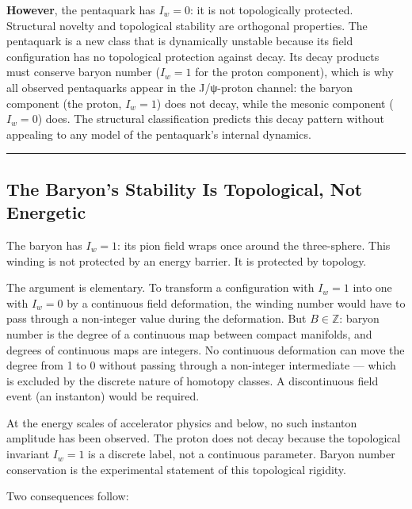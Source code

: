\documentclass[12pt,a4paper]{article}
\begin{document}
\textbf{However}, the pentaquark has \(I_w = 0\): it is not
topologically protected. Structural novelty and topological stability
are orthogonal properties. The pentaquark is a new class that
is dynamically unstable because its field configuration has no
topological protection against decay. Its decay products must conserve
baryon number (\(I_w = 1\) for the proton component), which is why all
observed pentaquarks appear in the J/ψ-proton channel: the baryon
component (the proton, \(I_w = 1\)) does not decay, while the mesonic
component (\(I_w = 0\)) does. The structural classification predicts
this decay pattern without appealing to any model of the pentaquark's
internal dynamics.

\begin{center}\rule{0.5\linewidth}{0.5pt}\end{center}

\hypertarget{the-baryons-stability-is-topological-not-energetic}{%
\subsection{The Baryon's Stability Is Topological, Not
Energetic}\label{the-baryons-stability-is-topological-not-energetic}}

The baryon has \(I_w = 1\): its pion field wraps once around the
three-sphere. This winding is not protected by an energy barrier. It is
protected by topology.

The argument is elementary. To transform a configuration with
\(I_w = 1\) into one with \(I_w = 0\) by a continuous field deformation,
the winding number would have to pass through a non-integer value during
the deformation. But \(B \in \mathbb{Z}\): baryon number is the degree
of a continuous map between compact manifolds, and degrees of continuous
maps are integers. No continuous deformation can move the degree from 1
to 0 without passing through a non-integer intermediate --- which is
excluded by the discrete nature of homotopy classes. A discontinuous
field event (an instanton) would be required.

At the energy scales of accelerator physics and below, no such instanton
amplitude has been observed. The proton does not decay because the
topological invariant \(I_w = 1\) is a discrete label, not a continuous
parameter. Baryon number conservation is the experimental statement of
this topological rigidity.

Two consequences follow:
\end{document}
